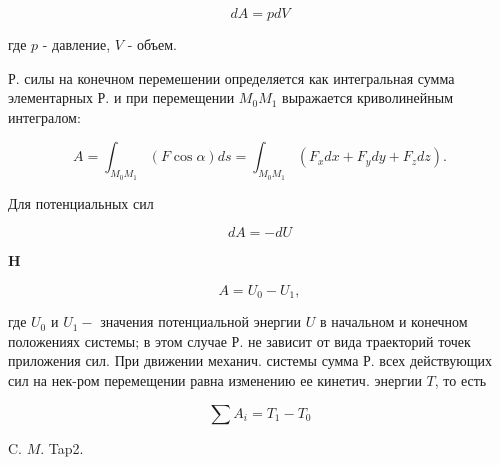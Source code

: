 \documentclass[10pt]{article}
\begin{document}
\[

d A=p d V

\]



где $p$ - давление, $V$ - объем.



Р. силы на конечном перемешении определяется как интегральная сумма элементарных Р. и при перемещении $M_{0} M_{1}$ выражается криволинейным интегралом:



\[

A=\int_{M_{0} M_{1}}(F \cos \alpha) d s=\int_{M_{0} M_{1}}\left(F_{x} d x+F_{y} d y+F_{z} d z\right) .

\]



Для потенциальных сил



\[

d A=-d U

\]



$\mathbf{H}$



\[

A=U_{0}-U_{1},

\]



где $U_{0}$ и $U_{1}-$ значения потенциальной энергии $U$ в начальном и конечном положениях системы; в этом случае Р. не зависит от вида траекторий точек приложения сил. При движении механич. системы сумма Р. всех действующих сил на нек-ром перемещении равна изменению ее кинетич. энергии $T$, то есть



\[

\sum A_{i}=T_{1}-T_{0}

\]



C. $M$. Tap2.
\end{document}
